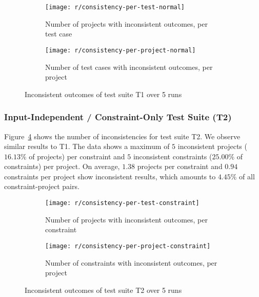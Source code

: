 \begin{figure}[htpb]
    \centering
    \begin{subfigure}{.65\textwidth}
        \texttt{[image: r/consistency-per-test-normal]}%
        \vspace{-\medskipamount}
        \caption{Number of projects with inconsistent outcomes, per test case}
        \label{fig:consistency_per_test_normal}
    \end{subfigure}
    \begin{subfigure}{.65\textwidth}
        \texttt{[image: r/consistency-per-project-normal]}%
        \vspace{-\medskipamount}
        \caption{Number of test cases with inconsistent outcomes, per project}
        \label{fig:consistency_per_project_normal}
    \end{subfigure}

    \caption{Inconsistent outcomes of test suite T1 over 5 runs}
    \label{fig:consistency_normal}
\end{figure}

\subsubsection{Input-Independent / Constraint-Only Test Suite (T2)}

Figure~\ref{fig:consistency_per_test_constraint} shows the number of inconsistencies for test suite T2.
We observe similar results to T1.
The data shows a maximum of $5$ inconsistent projects ($16.13\%$ of projects) per constraint and $5$ inconsistent constraints ($25.00\%$ of constraints) per project.
On average, $1.38$ projects per constraint and $0.94$ constraints per project show inconsistent results,
which amounts to $4.45\%$ of all constraint-project pairs.
\parspace

\begin{figure}[htpb]
    \centering
    \begin{subfigure}{.65\textwidth}
        \texttt{[image: r/consistency-per-test-constraint]}%
        \vspace{-\medskipamount}
        \caption{Number of projects with inconsistent outcomes, per constraint}
        \label{fig:consistency_per_test_constraint}
    \end{subfigure}
    \begin{subfigure}{.65\textwidth}
        \texttt{[image: r/consistency-per-project-constraint]}%
        \vspace{-\medskipamount}
        \caption{Number of constraints with inconsistent outcomes, per project}
        \label{fig:consistency_per_project_constraint}
    \end{subfigure}

    \caption{Inconsistent outcomes of test suite T2 over 5 runs}
    \label{fig:consistency_constraint}
\end{figure}

